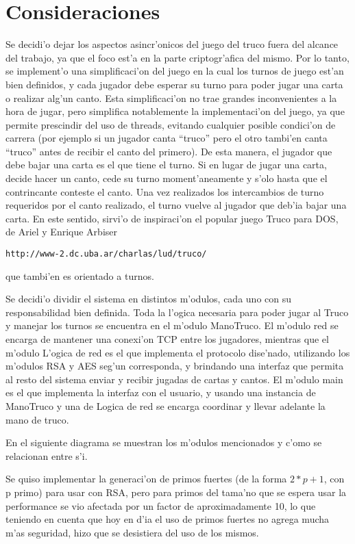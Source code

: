 \section{Consideraciones}
Se decidi'o dejar los aspectos asincr'onicos del juego del truco fuera del alcance del trabajo, ya que el foco est'a en la parte criptogr'afica del mismo.
Por lo tanto, se implement'o una simplificaci'on del juego en la cual los turnos de juego est'an bien definidos, y cada jugador debe esperar su turno para poder jugar una carta o realizar alg'un canto. Esta simplificaci'on no trae grandes inconvenientes a la hora de jugar, pero simplifica notablemente la implementaci'on del juego, ya que permite prescindir del uso de threads, evitando cualquier posible condici'on de carrera (por ejemplo si un jugador canta ``truco'' pero el otro tambi'en canta ``truco'' antes de recibir el canto del primero).
De esta manera, el jugador que debe bajar una carta es el que tiene el turno. Si en lugar de jugar una carta, decide hacer un canto, cede su turno moment'aneamente y s'olo hasta que el contrincante conteste el canto. Una vez realizados los intercambios de turno requeridos por el canto realizado, el turno vuelve al jugador que deb'ia bajar una carta.
En este sentido, sirvi'o de inspiraci'on el popular juego Truco para DOS, de Ariel y Enrique Arbiser

\begin{verbatim}
http://www-2.dc.uba.ar/charlas/lud/truco/
\end{verbatim}

que tambi'en es orientado a turnos.


Se decidi'o dividir el sistema en distintos m'odulos, cada uno con su responsabilidad bien definida. Toda la l'ogica necesaria para poder jugar al Truco y manejar los turnos se encuentra en el m'odulo ManoTruco. El m'odulo red se encarga de mantener una conexi'on TCP entre los jugadores, mientras que el m'odulo L'ogica de red es el que implementa el protocolo dise'nado, utilizando los m'odulos RSA y AES seg'un corresponda, y brindando una interfaz que permita al resto del sistema enviar y recibir jugadas de cartas y cantos. El m'odulo main es el que implementa la interfaz con el usuario, y usando una instancia de ManoTruco y una de Logica de red se encarga coordinar y llevar adelante la mano de truco.

En el siguiente diagrama se muestran los m'odulos mencionados y c'omo se relacionan entre s'i.



Se quiso implementar la generaci'on de primos fuertes (de la forma $2 * p + 1$, con p primo) para usar con RSA, pero para primos del tama'no que se espera usar la performance se vio afectada por un factor de aproximadamente 10, lo que teniendo en cuenta que hoy en d'ia el uso de primos fuertes no agrega mucha m'as seguridad, hizo que se desistiera del uso de los mismos.
